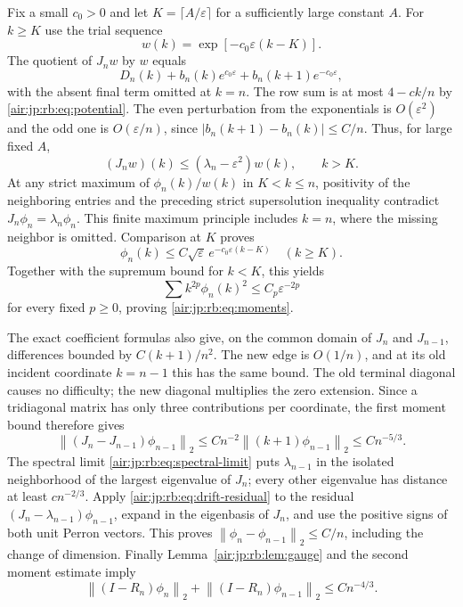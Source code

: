 \documentclass[11pt,letterpaper]{article}
\numberwithin{equation}{section}
\theoremstyle{remark}
\newcommand{\norm}[1]{\left\lVert#1\right\rVert}
\newcommand{\eps}{\varepsilon}
\begin{document}
Fix a small $c_0>0$ and let $K=\lceil A/\eps\rceil$ for a sufficiently large constant $A$. For $k\ge K$ use the trial sequence
\[
 w(k)=\exp[-c_0\eps(k-K)].
\]
The quotient of $J_nw$ by $w$ equals
\[
 D_n(k)+b_n(k)e^{c_0\eps}+b_n(k+1)e^{-c_0\eps},
\]
with the absent final term omitted at $k=n$. The row sum is at most $4-ck/n$ by \eqref{air:jp:rb:eq:potential}. The even perturbation from the exponentials is $O(\eps^2)$ and the odd one is $O(\eps/n)$, since $|b_n(k+1)-b_n(k)|\le C/n$. Thus, for large fixed $A$,
\[
 (J_nw)(k)\le(\lambda_n-\eps^2)w(k),\qquad k>K.
\]
At any strict maximum of $\phi_n(k)/w(k)$ in $K<k\le n$, positivity of the neighboring entries and the preceding strict supersolution inequality contradict $J_n\phi_n=\lambda_n\phi_n$. This finite maximum principle includes $k=n$, where the missing neighbor is omitted. Comparison at $K$ proves
\begin{equation}\label{air:jp:rb:eq:localization}
 \phi_n(k)\le C\sqrt\eps\,e^{-c_0\eps(k-K)}\quad(k\ge K).
\end{equation}
Together with the supremum bound for $k<K$, this yields
\[
 \sum k^{2p}\phi_n(k)^2\le C_p\eps^{-2p}
\]
for every fixed $p\ge0$, proving \eqref{air:jp:rb:eq:moments}.

The exact coefficient formulas also give, on the common domain of $J_n$ and $J_{n-1}$, differences bounded by $C(k+1)/n^2$. The new edge is $O(1/n)$, and at its old incident coordinate $k=n-1$ this has the same bound. The old terminal diagonal causes no difficulty; the new diagonal multiplies the zero extension. Since a tridiagonal matrix has only three contributions per coordinate, the first moment bound therefore gives
\begin{equation}\label{air:jp:rb:eq:drift-residual}
 \norm{(J_n-J_{n-1})\phi_{n-1}}_2
 \le Cn^{-2}\norm{(k+1)\phi_{n-1}}_2
 \le Cn^{-5/3}.
\end{equation}
The spectral limit \eqref{air:jp:rb:eq:spectral-limit} puts $\lambda_{n-1}$ in the isolated neighborhood of the largest eigenvalue of $J_n$; every other eigenvalue has distance at least $cn^{-2/3}$. Apply \eqref{air:jp:rb:eq:drift-residual} to the residual $(J_n-\lambda_{n-1})\phi_{n-1}$, expand in the eigenbasis of $J_n$, and use the positive signs of both unit Perron vectors. This proves
$\norm{\phi_n-\phi_{n-1}}_2\le C/n$, including the change of dimension.
Finally Lemma~\ref{air:jp:rb:lem:gauge} and the second moment estimate imply
\begin{equation}\label{air:jp:rb:eq:gauge-vector}
 \norm{(I-R_n)\phi_n}_2+\norm{(I-R_n)\phi_{n-1}}_2
 \le Cn^{-4/3}.
\end{equation}
\end{document}
